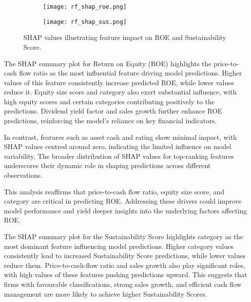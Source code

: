 \begin{figure}[ht]
    \centering
    \begin{subfigure}{0.45\textwidth}
        \centering
        \texttt{[image: rf\_shap\_roe.png]}
        \label{fig:shap_roe}
    \end{subfigure}
    \hfill
    \begin{subfigure}{0.45\textwidth}
        \centering
        \texttt{[image: rf\_shap\_sus.png]}
        \label{fig:shap_sus}
    \end{subfigure}
    \caption{SHAP values illustrating feature impact on ROE and Sustainability Score.}
    \label{fig:rf_shap_plots}
\end{figure}

\noindent The SHAP summary plot for Return on Equity (ROE) highlights the price-to-cash flow ratio as the most influential feature driving model predictions. Higher values of this feature consistently increase predicted ROE, while lower values reduce it. Equity size score and category also exert substantial influence, with high equity scores and certain categories contributing positively to the predictions. Dividend yield factor and sales growth further enhance ROE predictions, reinforcing the model's reliance on key financial indicators.

In contrast, features such as asset cash and rating show minimal impact, with SHAP values centred around zero, indicating the limited influence on model variability. The broader distribution of SHAP values for top-ranking features underscores their dynamic role in shaping predictions across different observations.

This analysis reaffirms that price-to-cash flow ratio, equity size score, and category are critical in predicting ROE. Addressing these drivers could improve model performance and yield deeper insights into the underlying factors affecting ROE.

The SHAP summary plot for the Sustainability Score highlights category as the most dominant feature influencing model predictions. Higher category values consistently lead to increased Sustainability Score predictions, while lower values reduce them. Price-to-cash-flow ratio and sales growth also play significant roles, with high values of these features pushing predictions upward. This suggests that firms with favourable classifications, strong sales growth, and efficient cash flow management are more likely to achieve higher Sustainability Scores.

